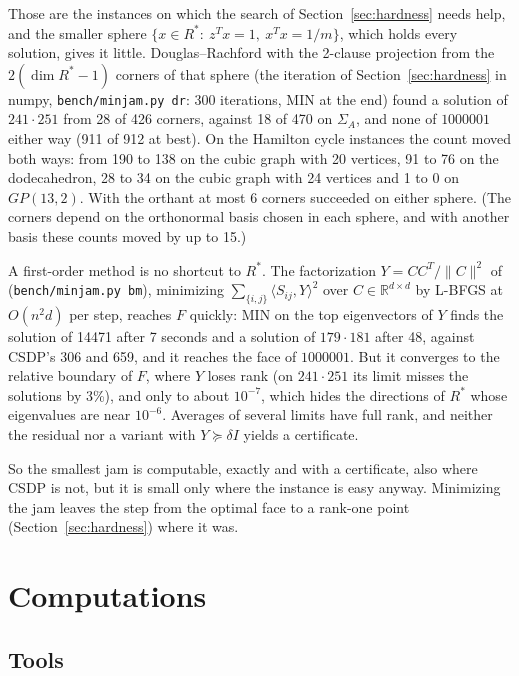 \documentclass[11pt]{article}
\theoremstyle{definition}
\theoremstyle{remark}
\newcommand{\R}{\mathbb{R}}
\begin{document}
Those are the instances on which the search of Section~\ref{sec:hardness}
needs help, and the smaller sphere $\{x\in R^*:\ z^Tx=1,\ x^Tx=1/m\}$, which
holds every solution, gives it little. Douglas--Rachford with the 2-clause
projection from the $2(\dim R^*-1)$ corners of that sphere (the iteration of
Section~\ref{sec:hardness} in numpy, \texttt{bench/minjam.py dr}: 300
iterations, MIN at the end) found a solution of $241\cdot251$ from 28 of 426
corners, against 18 of 470 on $\Sigma_A$, and none of $1000001$ either way
(911 of 912 at best). On the Hamilton cycle instances the count moved both
ways: from 190 to 138 on the cubic graph with 20 vertices, 91 to 76 on the
dodecahedron, 28 to 34 on the cubic graph with 24 vertices and 1 to 0 on
$GP(13,2)$. With the orthant at most 6 corners succeeded on either sphere.
(The corners depend on the orthonormal basis chosen in each sphere, and with
another basis these counts moved by up to 15.)

A first-order method is no shortcut to $R^*$. The factorization
$Y=CC^T/\|C\|^2$ of \cite{BM03} (\texttt{bench/minjam.py bm}), minimizing
$\sum_{\{i,j\}}\langle S_{ij},Y\rangle^2$ over $C\in\R^{d\times d}$ by
L-BFGS at $O(n^2d)$ per step, reaches $F$ quickly: MIN on the top
eigenvectors of $Y$ finds the solution of 14471 after 7 seconds and a
solution of $179\cdot181$ after 48, against CSDP's 306 and 659, and it
reaches the face of $1000001$. But it converges to the relative boundary of
$F$, where $Y$ loses rank (on $241\cdot251$ its limit misses the solutions
by 3\%), and only to about $10^{-7}$, which hides the directions of $R^*$
whose eigenvalues are near $10^{-6}$. Averages of several limits have full
rank, and neither the residual nor a variant with $Y\succeq\delta I$ yields
a certificate.

So the smallest jam is computable, exactly and with a certificate, also
where CSDP is not, but it is small only where the instance is easy anyway.
Minimizing the jam leaves the step from the optimal face to a rank-one
point (Section~\ref{sec:hardness}) where it was.

\section{Computations}
\label{sec:comp}

\subsection{Tools}
\end{document}
